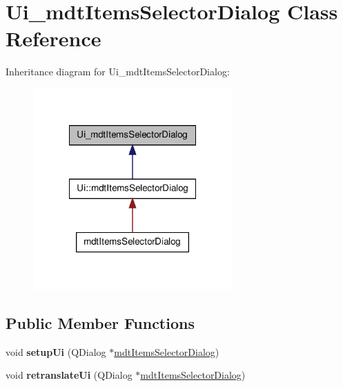 \hypertarget{class_ui__mdt_items_selector_dialog}{
\section{Ui\_\-mdtItemsSelectorDialog Class Reference}
\label{class_ui__mdt_items_selector_dialog}
}


Inheritance diagram for Ui\_\-mdtItemsSelectorDialog:\nopagebreak
\begin{figure}[H]
\begin{center}
\leavevmode
\includegraphics[width=216pt]{class_ui__mdt_items_selector_dialog__inherit__graph}
\end{center}
\end{figure}
\subsection*{Public Member Functions}
\begin{DoxyCompactItemize}
\item 
\hypertarget{class_ui__mdt_items_selector_dialog_adb513090c067d3f0a12bb03e54d3a086}{
void {\bfseries setupUi} (QDialog $\ast$\hyperlink{classmdt_items_selector_dialog}{mdtItemsSelectorDialog})}
\label{class_ui__mdt_items_selector_dialog_adb513090c067d3f0a12bb03e54d3a086}

\item 
\hypertarget{class_ui__mdt_items_selector_dialog_ad6847c92e2b0c4a82cf2830ad9335b83}{
void {\bfseries retranslateUi} (QDialog $\ast$\hyperlink{classmdt_items_selector_dialog}{mdtItemsSelectorDialog})}
\label{class_ui__mdt_items_selector_dialog_ad6847c92e2b0c4a82cf2830ad9335b83}

\end{DoxyCompactItemize}
